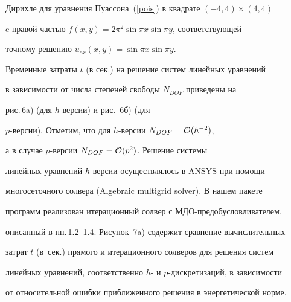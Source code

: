 Дирихле для уравнения Пуассона~(\ref{pois}) в квадрате $(-4,4)\times(4,4)$


c правой частью $f(x,y)=2\pi^2\sin\pi x\sin\pi y$, соответствующей 


точному решению $u_{ex}(x,y)=\sin\pi x\sin\pi y$.





Временные затраты $t$ (в сек.) на решение систем линейных уравнений 


в зависимости от числа степеней свободы $N_{DOF}$ приведены на 


рис.\,6a) (для $h$-версии) и рис.~6б) (для


$p$-версии). Отметим, что для $h$-версии $N_{DOF}={\cal O}(h^{-2})$,


а в случае $p$-версии $N_{DOF}={\cal O}(p^{2})$. Решение системы 


линейных уравнений $h$-версии осуществлялось в ANSYS при помощи 


многосеточного солвера (Algebraic multigrid solver). В нашем пакете 


программ реализован итерационный солвер с МДО-предобусловливателем, 


описанный в пп.\,1.2--1.4. Рисунок~7a) содержит сравнение вычислительных 


затрат $t$ (в~сек.) прямого и итерационного солверов для решения систем 


линейных уравнений, соответственно $h$- и $p$-дискретизаций, в зависимости 


от относительной ошибки приближенного решения в энергетической норме.






















